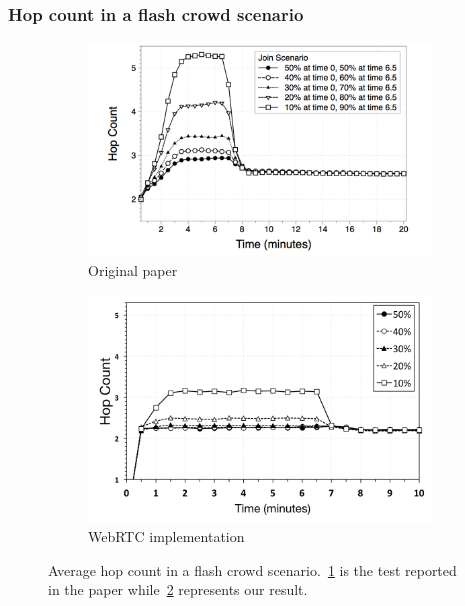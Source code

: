 \documentclass{beamer}
\begin{document}
\begin{frame}[t]
\frametitle{Hop count in a flash crowd scenario}

\begin{figure}
\centering
\begin{subfigure}{.5\textwidth}
  \centering
  \includegraphics[keepaspectratio=true, width=1\linewidth]{images/paper_average_hop_count_flash_crowd}
  \caption{Original paper}
  \label{fig:paper_average_hop_count_flash_crowd}
\end{subfigure}%
\begin{subfigure}{.5\textwidth}
  \centering
  \includegraphics[keepaspectratio=true, width=1\linewidth]{images/average_hop_count_flash_crowd_1impl}
  \caption{WebRTC implementation}
  \label{fig:average_hop_count_flash_crowd_1impl}
\end{subfigure}
\caption{Average hop count in a flash crowd scenario.~\ref{fig:paper_average_hop_count_flash_crowd} is the test reported in the paper while~\ref{fig:average_hop_count_flash_crowd_1impl} represents our result.}
\label{fig:robustness_hop_count_flash_crowd}
\end{figure}

\end{frame}
\end{document}
